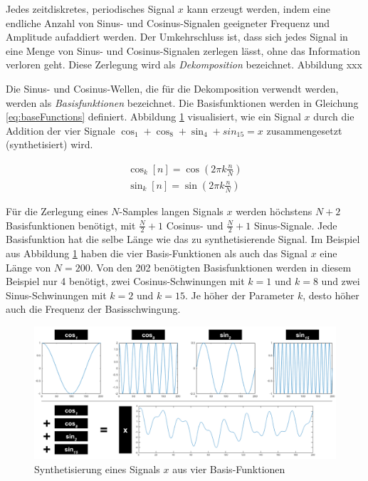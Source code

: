 
Jedes zeitdiskretes, periodisches Signal $x$ kann erzeugt werden, indem eine endliche Anzahl von Sinus- und Cosinus-Signalen geeigneter Frequenz und Amplitude aufaddiert werden. Der Umkehrschluss ist, dass sich jedes Signal in eine Menge von Sinus- und Cosinus-Signalen zerlegen lässt, ohne das Information verloren geht. Diese Zerlegung wird als \emph{Dekomposition} bezeichnet. Abbildung xxx


Die Sinus- und Cosinus-Wellen, die für die Dekomposition verwendt werden, werden als \emph{Basisfunktionen} bezeichnet. Die Basisfunktionen werden in Gleichung \ref{eq:baseFunctions} definiert. Abbildung \ref{img:fftExample01} visualisiert, wie ein Signal $x$ durch die Addition der vier Signale $\cos_1 + \cos_8 + \sin_4 + sin_15 = x$ zusammengesetzt (synthetisiert) wird.

\begin{equation}
\label{eq:baseFunctions}
\begin{split}
\cos_k[n] = \cos(2\pi k \frac{n}{N}) \\
\sin_k[n] = \sin(2\pi k \frac{n}{N})
\end{split}
\end{equation}

Für die Zerlegung eines $N$-Samples langen Signals $x$ werden höchstens $N+2$ Basisfunktionen benötigt, mit $\frac{N}{2}+1$ Cosinus- und  $\frac{N}{2}+1$ Sinus-Signale. Jede Basisfunktion hat die selbe Länge wie das zu synthetisierende Signal. Im Beispiel aus Abbildung \ref{img:fftExample01} haben die vier Basis-Funktionen als auch das Signal $x$ eine Länge von $N = 200$. Von den 202 benötigten Basisfunktionen werden in diesem Beispiel nur 4 benötigt, zwei Cosinus-Schwinungen mit $k = 1$ und $k = 8$ und zwei Sinus-Schwinungen mit $k = 2$ und $k=15$. Je höher der Parameter $k$, desto höher auch die Frequenz der Basisschwingung. 

\begin{figure}[h]
	\centering
	\includegraphics[width=1\textwidth]{bilder/fftExp01.png}
	\caption{Synthetisierung eines Signals $x$ aus vier Basis-Funktionen}
	\label{img:fftExample01}
\end{figure}


